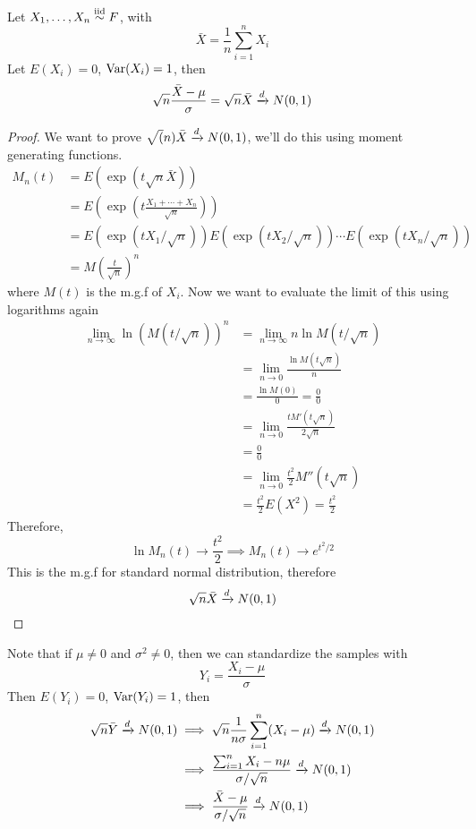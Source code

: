 \documentclass[openany]{report}
\begin{document}
\begin{theorem}
    Let $X_1, \ldots, X_n \overset{\mathrm{iid}}{\sim} F$, with 
    \[\bar{X} = \frac{1}{n}\sum_{i=1}^n X_i\]
    Let $E(X_i) = 0$, $\operatorname{Var}(X_i) = 1$, then 
    \[\sqrt{n}\frac{\bar{X} - \mu}{\sigma} = \sqrt{n}\bar{X} \xrightarrow{d} N(0,1)\]
\end{theorem}
\begin{proof}
    We want to prove $\sqrt(n)\bar{X} \xrightarrow{d} N(0,1)$, we'll do this using moment generating functions. 
    \begin{align*}
        M_n(t) &= E(\exp(t\sqrt{n}\bar{X}))\\
        &= E\left(\exp\left(t \frac{X_1 + \cdots + X_n}{\sqrt{n}}\right)\right)\\
        &= E(\exp(tX_1/\sqrt{n}))E(\exp(tX_2/\sqrt{n}))\cdots E(\exp(tX_n/\sqrt{n}))\\
        &= M\left(\frac{t}{\sqrt{n}}\right)^n
    \end{align*}
    where $M(t)$ is the m.g.f of $X_i$. Now we want to evaluate the limit of this using logarithms again
    \begin{align*}
        \lim_{n\rightarrow\infty} \ln (M(t/\sqrt{n}))^n &= \lim_{n\rightarrow\infty} n\ln M(t/\sqrt{n})\\
        &= \lim_{n\rightarrow 0}\frac{\ln M(t\sqrt{n})}{n}\tag{Replace $n$ with $1/n$}\\
        &= \frac{\ln M(0)}{0} = \frac{0}{0}\tag{Use L'Hoptial's Rule}\\
        &= \lim_{n\rightarrow 0} \frac{tM'(t\sqrt{n})}{2\sqrt{n}}\\
        &= \frac{0}{0}\tag{$M'(0) = \mu = 0$}\\
        &= \lim_{n\rightarrow 0} \frac{t^2}{2}M''(t\sqrt{n})\\
        &= \frac{t^2}{2}E(X^2) =\frac{t^2}{2}
    \end{align*}
    Therefore,
    \[\ln M_n(t) \rightarrow \frac{t^2}{2} \implies M_n(t) \rightarrow e^{t^2/2}\]
    This is the m.g.f for standard normal distribution, therefore 
    \[\sqrt{n}\bar{X} \xrightarrow{d} N(0,1)\]
\end{proof}
Note that if $\mu \neq 0$ and $\sigma^2 \neq 0$, then we can standardize the samples with 
\[Y_i = \frac{X_i - \mu}{\sigma}\] 
Then $E(Y_i) = 0$, $\operatorname{Var}(Y_i) = 1$, then 
\begin{align*}
    \sqrt{n}\bar{Y} \xrightarrow{d} N(0,1) &\implies \sqrt{n}\frac{1}{n\sigma}\sum_{i=1}^n(X_i-\mu) \xrightarrow{d} N(0,1)\\
    &\implies \frac{\sum_{i=1}^n X_i - n\mu}{\sigma/\sqrt{n}}\xrightarrow{d} N(0,1)\\
    &\implies \frac{\bar{X} - \mu}{\sigma/\sqrt{n}} \xrightarrow{d} N(0,1)
\end{align*}
\end{document}
